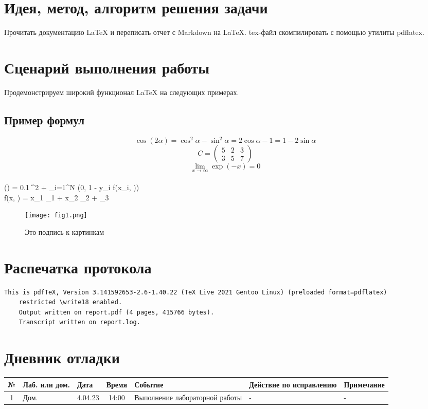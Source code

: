 \documentclass[12pt, letterpaper]{article}
\begin{document}
\section{Идея, метод, алгоритм решения задачи}
Прочитать документацию \LaTeX{} и переписать отчет с Markdown на \LaTeX{}. tex-файл скомпилировать с помощью утилиты pdflatex.
\section{Сценарий выполнения работы}
Продемонстрируем широкий функционал \LaTeX{} на следующих примерах.
\subsection{Пример формул}
\[\cos (2\alpha) = \cos^2 \alpha - \sin^2 \alpha = 2\cos\alpha - 1 = 1 - 2\sin\alpha\]
\[C=
\begin{pmatrix}
5 & 2 & 3\\
3 & 5 & 7
\end{pmatrix}\]
\[
\lim\limits_{x \to \infty} \exp(-x) = 0
\] \\
(\theta) = 0.1 \|\theta\|^2 + \sum\limits_{i=1}^N \max(0, 1 - y_i f(x_i, \theta)) \\
f(x, \theta) = x_1 \theta_1 + x_2 \theta_2 + \theta_3 \\
\begin{figure}[h]
\centering
\texttt{[image: fig1.png]}
\caption{Это подпись к картинкам}
\label{fig:mpr}
\end{figure}
\section{Распечатка протокола}
\begin{lstlisting}[breaklines]
    This is pdfTeX, Version 3.141592653-2.6-1.40.22 (TeX Live 2021 Gentoo Linux) (preloaded format=pdflatex)
    restricted \write18 enabled.
    Output written on report.pdf (4 pages, 415766 bytes).
    Transcript written on report.log.
\end{lstlisting}  
\section{Дневник отладки}
\begin{tabular}{|c|p{1cm}|p{1.5cm}|c|p{2.5cm}|p{2cm}|p{2.25cm}|}
    \hline
    № & Лаб. или дом. & Дата & Время & Событие & Действие по исправлению & Примечание\\
    \hline
    1 & Дом. & 4.04.23 & 14:00 & Выполнение лабораторной работы & - & -\\
    \hline
\end{tabular}
\end{document}
